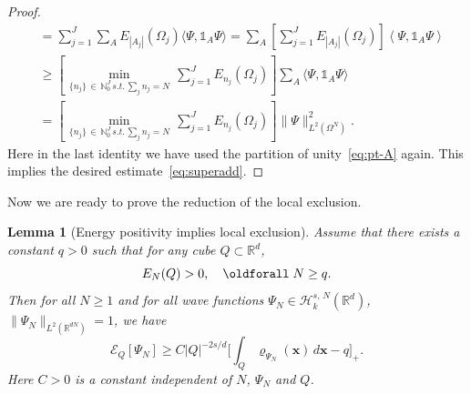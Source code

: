 \documentclass[10pt]{amsart}
\newtheorem{lemm}[theo]{Lemma}\newtheorem{prop}[theo]{Proposition}\newtheorem{coro}[theo]{Corollary}\newtheorem{conj}[theo]{Conjecture}
\theoremstyle{definition}\newtheorem{defi}[theo]{Definition}\newtheorem{rema}[theo]{Remark}\newtheorem{exam}[theo]{Example}\newtheorem{exem}[theo]{Example}\newtheorem{nota}[theo]{Notation}
\newcommand*\R {\mathbb{R}}
\newcommand\1{{\ensuremath {\mathds 1} }}
\newcommand{\bx}{\mathbf{x}}
\newcommand{\cH}{\mathcal{H}}
\newcommand{\cE}{\mathcal{E}}
\renewcommand*{\forall}{\mathrel{\oldforall}}
\begin{document}
\begin{proof}
\begin{align*}
&=
\sum_{j=1}^J \sum_{A} E_{|A_j|}(\Omega_j) \langle \Psi, \1_A \Psi\rangle =
\sum_{A} \left[\sum_{j=1}^J E_{|A_j|}(\Omega_j) \right] \left\langle \Psi, \1_A \Psi\right\rangle\\
&\ge
\left[\hspace{1pt} \min_{\{n_j\}\,\in\,\mathbb{N}_0^J \, s.t. \, \sum_{j} n_j=N} \, \sum_{j=1}^J E_{n_j}(\Omega_j) \right] \sum_A \langle \Psi, \1_A \Psi\rangle\\
&=
\left[\hspace{1pt} \min_{\{n_j\}\,\in\,\mathbb{N}_0^J \, s.t. \, \sum_{j} n_j=N} \, \sum_{j=1}^J E_{n_j}(\Omega_j) \right] \|\Psi\|^2_{L^2(\Omega^N)}.
\end{align*}
Here in the last identity we have used the partition of unity~\eqref{eq:pt-A} again. This implies the desired estimate~\eqref{eq:superadd}.
\end{proof}

Now we are ready to prove the reduction of the local exclusion.

\begin{lemm}[Energy positivity implies local exclusion]\label{lem:sim-local-exclusion}
Assume that there exists a constant $q>0$ such that for any cube $Q\subset \R^d$,
\begin{equation}\label{eq:local-exclusion-positivity}
E_N(Q) > 0, \quad \forall N\ge q.
\end{equation}
Then for all $N \ge 1$ and for all wave functions $\Psi_N\in \cH^{s,\,N}_k(\R^d)$, $\|\Psi_N\|_{L^2(\R^{dN})}=1$, we have
\begin{equation}\label{eq:loca-exclusion-vanishing}
\cE_Q[\Psi_N] \ge C |Q|^{-2s/d} \biggl[\int_Q \varrho_{\Psi_N}(\bx)\,d\bx - q \biggr]_+.
\end{equation}
Here $C>0$ is a constant independent of $N$, $\Psi_N$ and $Q$.
\end{lemm}
\end{document}
